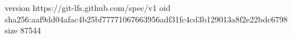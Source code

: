 version https://git-lfs.github.com/spec/v1
oid sha256:aaf9dd04afac4b25bf77771067663956adf31fc4cd3b129013a8f2e22bdc6798
size 87544
